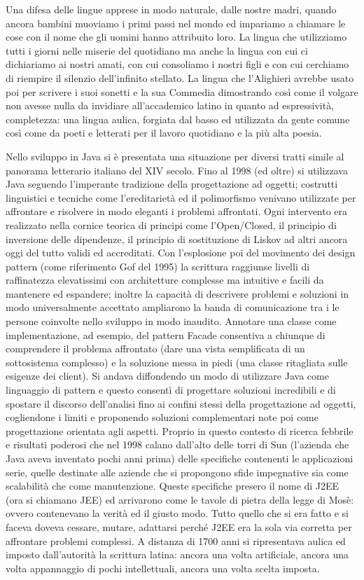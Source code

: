 Una difesa delle lingue apprese in modo naturale, dalle nostre madri, quando ancora bambini muoviamo i primi passi nel mondo ed impariamo a chiamare le cose con il nome che gli uomini hanno attribuito loro. La lingua che utilizziamo tutti i giorni nelle miserie del quotidiano ma anche la lingua con cui ci dichiariamo ai nostri amati, con cui consoliamo i nostri figli e con cui cerchiamo di riempire il silenzio dell'infinito stellato. La lingua che l'Alighieri avrebbe usato poi per scrivere i suoi sonetti e la sua Commedia dimostrando così come il volgare non avesse nulla da invidiare all'accademico latino in quanto ad espressività, completezza: una lingua aulica, forgiata dal basso ed utilizzata da gente comune così come da poeti e letterati per il lavoro quotidiano e la più alta poesia.

Nello sviluppo in Java si è presentata una situazione per diversi tratti simile al panorama letterario italiano del XIV secolo. Fino al 1998 (ed oltre) si utilizzava Java seguendo l'imperante tradizione della progettazione ad oggetti; costrutti linguistici e tecniche come l'ereditarietà ed il polimorfismo venivano utilizzate per affrontare e risolvere in modo eleganti i problemi affrontati. Ogni intervento era realizzato nella cornice teorica di principi come l'Open/Closed, il principio di inversione delle dipendenze, il principio di sostituzione di Liskov ad altri ancora oggi del tutto validi ed accreditati. Con l'esplosione poi del movimento dei design pattern (come riferimento Gof del 1995) la scrittura raggiunse livelli di raffinatezza elevatissimi con architetture complesse ma intuitive e facili da mantenere ed espandere; inoltre la capacità di descrivere problemi e soluzioni in modo universalmente accettato ampliarono la banda di comunicazione tra i le persone coinvolte nello sviluppo in modo inaudito. Annotare una classe come implementazione, ad esempio, del pattern Facade consentiva a chiunque di comprendere il problema affrontato (dare una vista semplificata di un sottosistema complesso) e la soluzione messa in piedi (una classe ritagliata sulle esigenze dei client). Si andava diffondendo un modo di utilizzare Java come linguaggio di pattern e questo consentì di progettare soluzioni incredibili e di spostare il discorso dell'analisi fino ai confini stessi della progettazione ad oggetti, cogliendone i limiti e proponendo soluzioni complementari note poi come progettazione orientata agli aspetti.
Proprio in questo contesto di ricerca febbrile e risultati poderosi che nel 1998 calano dall'alto delle torri di Sun (l'azienda che Java aveva inventato pochi anni prima) delle specifiche contenenti  le applicazioni serie, quelle destinate alle aziende che si propongono sfide impegnative sia come scalabilità che come manutenzione. Queste specifiche presero il nome di J2EE (ora si chiamano JEE) ed arrivarono come le tavole di pietra della legge di Mosè: ovvero contenevano la verità ed il giusto modo. Tutto quello che si era fatto e si faceva doveva cessare, mutare, adattarsi perché J2EE era la sola via corretta per affrontare problemi complessi. A distanza di 1700 anni si ripresentava aulica ed imposto dall'autorità la scrittura latina: ancora una volta artificiale, ancora una volta appannaggio di pochi intellettuali, ancora una volta scelta imposta.
